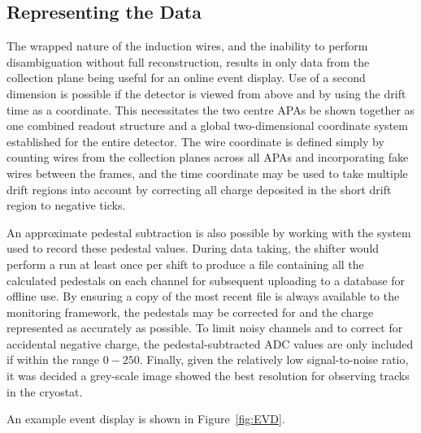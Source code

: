 \subsection{Representing the Data}\label{RepresentingEVDData}

The wrapped nature of the induction wires, and the inability to perform disambiguation without full reconstruction, results in only data from the collection plane being useful for an online event display.  Use of a second dimension is possible if the detector is viewed from above and by using the drift time as a coordinate.  This necessitates the two centre APAs be shown together as one combined readout structure and a global two-dimensional coordinate system established for the entire detector.  The wire coordinate is defined simply by counting wires from the collection planes across all APAs and incorporating fake wires between the frames, and the time coordinate may be used to take multiple drift regions into account by correcting all charge deposited in the short drift region to negative ticks.

An approximate pedestal subtraction is also possible by working with the system used to record these pedestal values.  During data taking, the shifter would perform a run at least once per shift to produce a file containing all the calculated pedestals on each channel for subsequent uploading to a database for offline use.  By ensuring a copy of the most recent file is always available to the monitoring framework, the pedestals may be corrected for and the charge represented as accurately as possible.  To limit noisy channels and to correct for accidental negative charge, the pedestal-subtracted ADC values are only included if within the range $0-250$.  Finally, given the relatively low signal-to-noise ratio, it was decided a grey-scale image showed the best resolution for observing tracks in the cryostat.

An example event display is shown in Figure~\ref{fig:EVD}.

